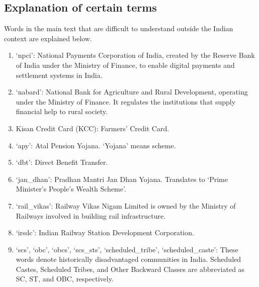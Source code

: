 \documentclass[10pt, a4paper]{article}
\begin{document}
\subsection{Explanation of certain terms}
Words in the main text that are difficult to understand outside the Indian context are explained below. 
\begin{enumerate}
    \itemsep0.2em
    \item `npci': National Payments Corporation of India, created by the Reserve Bank of India under the Ministry of Finance, to enable digital payments and settlement systems in India.
    \item `nabard': National Bank for Agriculture and Rural Development, operating under the Ministry of Finance. It regulates the institutions that supply financial help to rural society. 
    \item Kisan Credit Card (KCC): Farmers' Credit Card.
    \item `apy': Atal Pension Yojana. `Yojana' means scheme.
    \item `dbt': Direct Benefit Transfer.
    \item `jan\_dhan': Pradhan Mantri Jan Dhan Yojana. Translates to `Prime Minister's People's Wealth Scheme'.
    \item `rail\_vikas': Railway Vikas Nigam Limited is owned by the Ministry of Railways involved in building rail infrastructure.
    \item `irsdc': Indian Railway Station Development Corporation.
    \item `scs', `obc', `obcs', `scs\_sts', `scheduled\_tribe',  `scheduled\_caste': These words denote historically disadvantaged communities in  India. Scheduled Castes, Scheduled Tribes, and Other Backward Classes are abbreviated as SC, ST, and OBC, respectively.
\end{enumerate}
\end{document}

